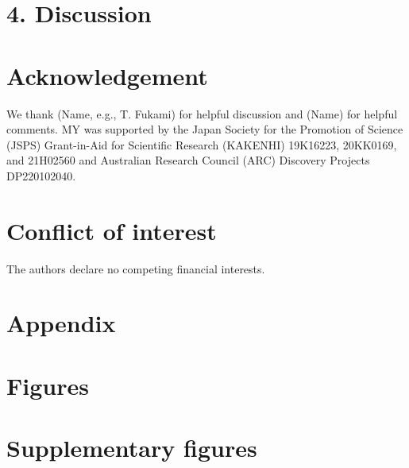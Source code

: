 \documentclass[12pt, a4paper]{article}
\begin{document}
\section*{4. Discussion}


\newpage
\section*{Acknowledgement}
We thank (Name, e.g., T. Fukami) for helpful discussion and (Name) for helpful comments. MY was supported by the Japan Society for the Promotion of Science (JSPS) Grant-in-Aid for Scientific Research (KAKENHI) 19K16223, 20KK0169, and 21H02560 and Australian Research Council (ARC) Discovery Projects DP220102040. 

\section*{Conflict of interest}
The authors declare no competing financial interests.

\newpage

\newpage
\section*{Appendix}


\newpage
\section*{Figures}

\newpage
\section*{Supplementary figures}

\end{document}
